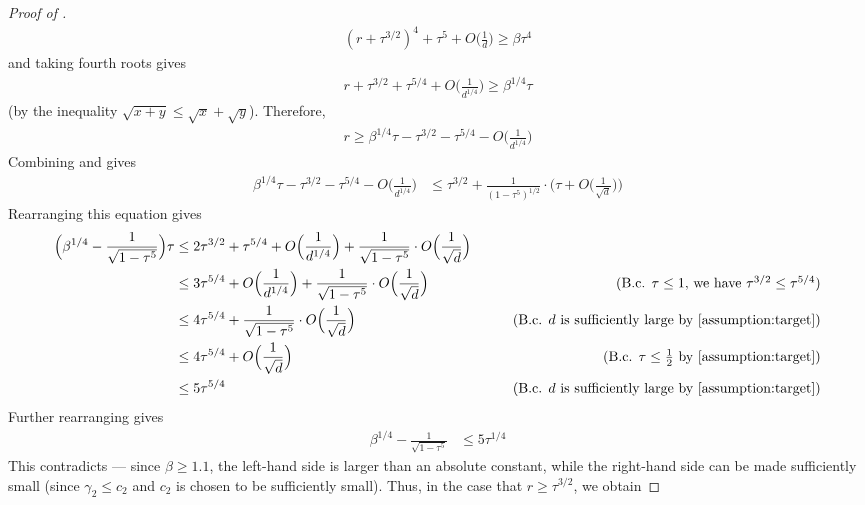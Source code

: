 \begin{proof}[Proof of ]
\begin{align}
(r + \tau^{3/2})^4 + \tau^5 + O\Big(\frac{1}{d}\Big) \geq \beta \tau^4
\end{align}
and taking fourth roots gives
\begin{align}
r + \tau^{3/2} + \tau^{5/4} + O\Big(\frac{1}{d^{1/4}}\Big) \geq \beta^{1/4} \tau
\end{align}
(by the inequality $\sqrt{x + y} \leq \sqrt{x} + \sqrt{y}$). Therefore,
\begin{align} \label{eq:r_lower_bound_phase3_case2}
r \geq \beta^{1/4} \tau - \tau^{3/2} - \tau^{5/4} - O\Big(\frac{1}{d^{1/4}}\Big)
\end{align}
Combining  and  gives
\begin{align}
\beta^{1/4} \tau - \tau^{3/2} - \tau^{5/4} - O\Big(\frac{1}{d^{1/4}}\Big)
& \leq \tau^{3/2} + \frac{1}{(1 - \tau^5)^{1/2}} \cdot \Big(\tau + O\Big(\frac{1}{\sqrt{d}}\Big)\Big)
\end{align}
Rearranging this equation gives
\begin{align}
\Big(\beta^{1/4} - \frac{1}{\sqrt{1 - \tau^5}}\Big) \tau
& \leq 2 \tau^{3/2} + \tau^{5/4} + O\Big(\frac{1}{d^{1/4}}\Big) + \frac{1}{\sqrt{1 - \tau^5}} \cdot O\Big(\frac{1}{\sqrt{d}}\Big) \\
& \leq 3 \tau^{5/4} + O\Big(\frac{1}{d^{1/4}}\Big) + \frac{1}{\sqrt{1 - \tau^5}} \cdot O\Big(\frac{1}{\sqrt{d}}\Big)
& \tag{B.c. $\tau \leq 1$, we have $\tau^{3/2} \leq \tau^{5/4}$} \\
& \leq 4 \tau^{5/4} + \frac{1}{\sqrt{1 - \tau^5}} \cdot O\Big(\frac{1}{\sqrt{d}}\Big) 
& \tag{B.c. $d$ is sufficiently large by \Cref{assumption:target}} \\
& \leq 4 \tau^{5/4} + O\Big(\frac{1}{\sqrt{d}}\Big)
& \tag{B.c. $\tau \leq \frac{1}{2}$ by \Cref{assumption:target}} \\
& \leq 5 \tau^{5/4} 
& \tag{B.c. $d$ is sufficiently large by \Cref{assumption:target}}
\end{align}
Further rearranging gives
\begin{align}
\beta^{1/4} - \frac{1}{\sqrt{1 - \tau^5}}
& \leq 5 \tau^{1/4}
\end{align}
This contradicts  --- since $\beta \geq 1.1$, the left-hand side is larger than an absolute constant, while the right-hand side can be made sufficiently small (since $\gamma_2 \leq c_2$ and $c_2$ is chosen to be sufficiently small). Thus, in the case that $r \geq \tau^{3/2}$, we obtain

\end{proof}
